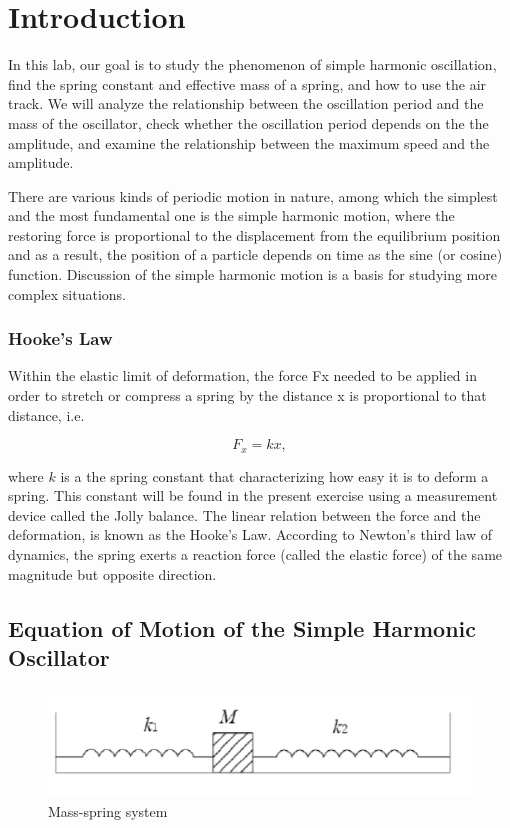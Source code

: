 \section{Introduction}

In this lab, our goal is to study the phenomenon of simple harmonic oscillation,
find the spring constant and effective mass of a spring,
and how to use the air track. We will analyze the relationship between the
oscillation period and the mass of the oscillator, check whether the oscillation
period depends on the the amplitude, and examine the relationship between the
maximum speed and the amplitude. 



There are various kinds of periodic motion in nature, among which the simplest
and the most fundamental one is the simple harmonic motion, where the restoring
force is proportional to the displacement from the equilibrium position and as a
result, the position of a particle depends on time as the sine (or cosine)
function. Discussion of the simple harmonic motion is a basis for studying more
complex situations. 


\subsubsection{Hooke's Law}
Within the elastic limit of deformation, the force Fx needed to be applied in
order to stretch or compress a spring by the distance x is proportional to that
distance, i.e.

\begin{equation}
        \label{hookeslaw}
        F_x=kx,
\end{equation}

where $k$ is a the spring constant that characterizing how easy it is to deform a
spring.
This constant will be found in the present exercise using a measurement device
called the Jolly balance. 
The linear relation  between the force and the deformation, is known as the
Hooke’s Law.
According to Newton's third law of dynamics, the spring exerts a reaction force
(called the elastic force) of the same magnitude but opposite direction. 

\subsection{Equation of Motion of the Simple Harmonic Oscillator}
\begin{figure}[H]
\centering
\includegraphics[width=15cm]{fig/i1}
\caption{Mass-spring system}
\label{mss}
\end{figure}

